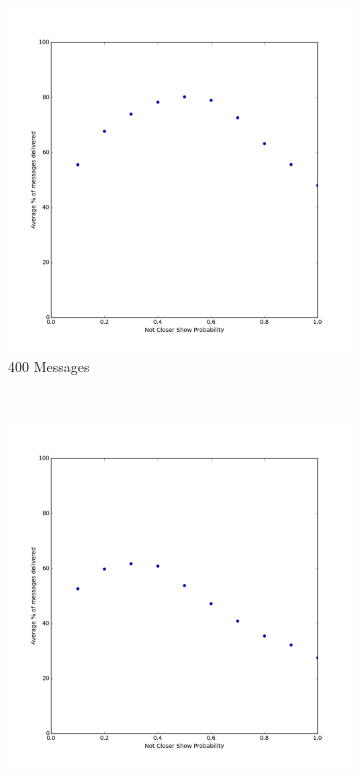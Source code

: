\documentclass[bsc,frontabs,twoside,singlespacing,parskip,deptreport]{infthesis}     %
\begin{document}
\begin{figure}[h]
\begin{subfigure}[b]{0.3\textwidth}
        \includegraphics[width=\textwidth]{results/notCloserProb_400messages}
        \caption{400 Messages}
        \label{fig:results/notCloserProb_400messages}
    \end{subfigure}
    ~ %
    \begin{subfigure}[b]{0.3\textwidth}
        \includegraphics[width=\textwidth]{results/notCloserProb_800messages}

\end{subfigure}
\end{figure}
\end{document}
